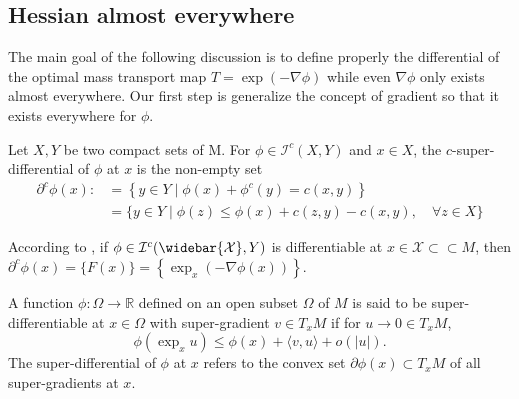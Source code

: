 \subsection{Hessian almost everywhere}
The main goal of the following discussion is to define properly the differential
of the optimal mass transport map $T = \exp (- \nabla \phi)$ while even $ \nabla \phi$ only exists almost everywhere.
Our first step is generalize the concept of gradient
so that it exists everywhere for $\phi$.
\begin{defn}
	Let \( X , Y \) be two compact sets of M. For \( \phi \in \mathcal { I } ^ { c } ( X , Y ) \)
	and \( x \in X \), the \( c \)-super-differential of \( \phi \) at \( x \) is the non-empty set
	\begin{align}
		\partial ^ { c } \phi ( x ) : & = \left\{ y \in Y \mid \phi ( x ) + \phi ^ { c } ( y ) = c ( x , y ) \right\}                     \\
		                              & = \{ y \in Y \mid \phi ( z ) \leq \phi ( x ) + c ( z , y ) - c ( x , y ), \quad \forall z \in X \}
		\label{equa:c-super-differential}
	\end{align}
\end{defn}

\begin{example} 
	\label{example:minimizer_differentiable}
	According to ,
	if \( \phi \in \mathcal { I } ^ { c } ( \widebar {\mathcal{X} } , Y ) \) is differentiable at
	\( x \in \mathcal { X } \subset \subset M \),
	then \( \partial ^ { c } \phi ( x ) = \{ F ( x ) \} = \left\{ \exp _ { x } ( - \nabla \phi ( x ) ) \right\} \).
\end{example}

\begin{defn}
	A function \( \phi : \Omega \rightarrow \mathbb { R } \) defined on an open subset \( \Omega \) of \( M \)
	is said to be super-differentiable at \( x \in \Omega \) with super-gradient \( v \in T _ { x } M \) if for
	\( u \rightarrow 0 \in T _ { x } M \),
	\begin{equation}
		\label{equa:super-differential}
		\phi \left( \exp _ { x } u \right) \leq \phi ( x ) + \langle v , u \rangle + o ( | u | ).
	\end{equation}
	The super-differential of \( \phi \) at \( x \) refers to
	the convex set \( \partial \phi ( x ) \subset T _ { x } M \) of all super-gradients at \( x \).
\end{defn}

